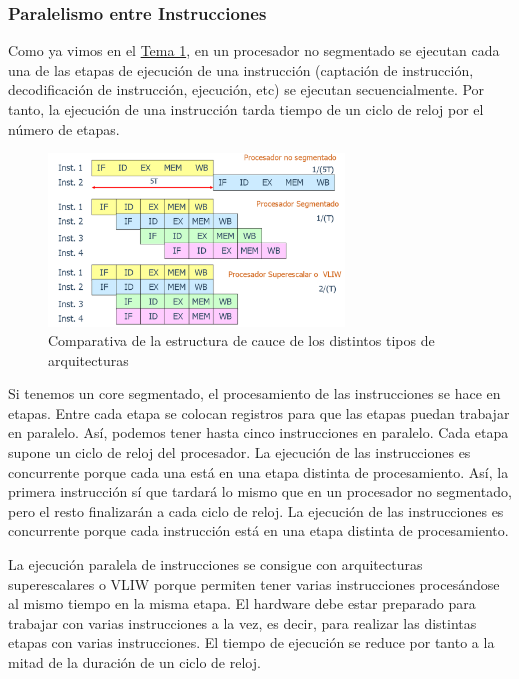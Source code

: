 \documentclass[10pt,a4paper,spanish]{report}
\begin{document}
\textcolor{azul}{\subsubsection{Paralelismo entre Instrucciones}}
Como ya vimos en el \hyperref[segmentado_tipos]{Tema 1}, en un procesador no segmentado se ejecutan cada una de las etapas de ejecución de una instrucción (captación de instrucción, decodificación de instrucción, ejecución, etc) se ejecutan secuencialmente. Por tanto, la ejecución de una instrucción tarda tiempo de un ciclo de reloj por el número de etapas.

\begin{figure}[!h]
\centering
\includegraphics[width=0.7\textwidth]{80}
\caption{Comparativa de la estructura de cauce de los distintos tipos de arquitecturas}
\label{segmentados_t}
\end{figure}

Si tenemos un core segmentado, el procesamiento de las instrucciones se hace en etapas. Entre cada etapa se colocan registros para que las etapas puedan trabajar en paralelo. Así, podemos tener hasta cinco instrucciones en paralelo. Cada etapa supone un ciclo de reloj del procesador. La ejecución de las instrucciones es concurrente porque cada una está en una etapa distinta de procesamiento. Así, la primera instrucción sí que tardará lo mismo que en un procesador no segmentado, pero el resto finalizarán a cada ciclo de reloj. La ejecución de las instrucciones es concurrente porque cada instrucción está en una etapa distinta de procesamiento.

La ejecución paralela de instrucciones se consigue con arquitecturas superescalares o VLIW porque permiten tener varias instrucciones procesándose al mismo tiempo en la misma etapa. El hardware debe estar preparado para trabajar con varias instrucciones a la vez, es decir, para realizar las distintas etapas con varias instrucciones. El tiempo de ejecución se reduce por tanto a la mitad de la duración de un ciclo de reloj.
\end{document}
